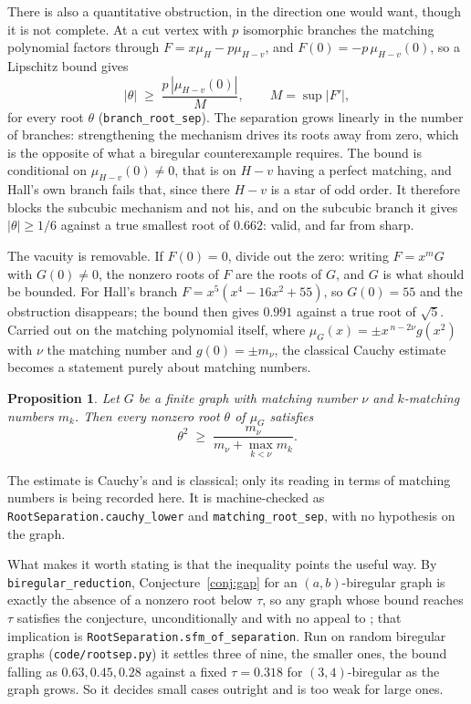 \documentclass[11pt]{article}
\newtheorem{proposition}[theorem]{Proposition}
\theoremstyle{remark}
\begin{document}
There is also a quantitative obstruction, in the direction one would want, though it is not
complete. At a cut vertex with $p$ isomorphic branches the matching polynomial factors through
$F=x\mu_H-p\mu_{H-v}$, and $F(0)=-p\,\mu_{H-v}(0)$, so a Lipschitz bound gives
\[
   |\theta|\;\ge\;\frac{p\,|\mu_{H-v}(0)|}{M},\qquad M=\sup|F'| ,
\]
for every root $\theta$ (\texttt{branch\_root\_sep}). The separation grows linearly in the
number of branches: strengthening the mechanism drives its roots away from zero, which is the
opposite of what a biregular counterexample requires. The bound is conditional on
$\mu_{H-v}(0)\neq0$, that is on $H-v$ having a perfect matching, and Hall's own branch fails
that, since there $H-v$ is a star of odd order. It therefore blocks the subcubic mechanism and
not his, and on the subcubic branch it gives $|\theta|\ge1/6$ against a true smallest root of
$0.662$: valid, and far from sharp.

The vacuity is removable. If $F(0)=0$, divide out the zero: writing $F=x^mG$ with $G(0)\neq0$,
the nonzero roots of $F$ are the roots of $G$, and $G$ is what should be bounded. For Hall's
branch $F=x^5(x^4-16x^2+55)$, so $G(0)=55$ and the obstruction disappears; the bound then
gives $0.991$ against a true root of $\sqrt5$. Carried out on the matching polynomial itself,
where $\mu_G(x)=\pm x^{\,n-2\nu}g(x^2)$ with $\nu$ the matching number and $g(0)=\pm m_\nu$,
the classical Cauchy estimate becomes a statement purely about matching numbers.

\begin{proposition}\label{prop:rootsep}
Let $G$ be a finite graph with matching number $\nu$ and $k$-matching numbers $m_k$. Then
every nonzero root $\theta$ of $\mu_G$ satisfies
\[
   \theta^2\;\ge\;\frac{m_\nu}{m_\nu+\max_{k<\nu}m_k}.
\]
\end{proposition}

The estimate is Cauchy's and is classical; only its reading in terms of matching numbers is
being recorded here. It is machine-checked as \texttt{RootSeparation.cauchy\_lower} and
\texttt{matching\_root\_sep}, with no hypothesis on the graph.

What makes it worth stating is that the inequality points the useful way. By
\texttt{biregular\_reduction}, Conjecture~\ref{conj:gap} for an $(a,b)$-biregular graph is
exactly the absence of a nonzero root below $\tau$, so any graph whose bound reaches $\tau$
satisfies the conjecture, unconditionally and with no appeal to \cite{AFH}; that implication
is \texttt{RootSeparation.sfm\_of\_separation}. Run on random biregular graphs
(\texttt{code/rootsep.py}) it settles three of nine, the smaller ones, the bound falling as
$0.63,0.45,0.28$ against a fixed $\tau=0.318$ for $(3,4)$-biregular as the graph grows. So it
decides small cases outright and is too weak for large ones.
\end{document}
